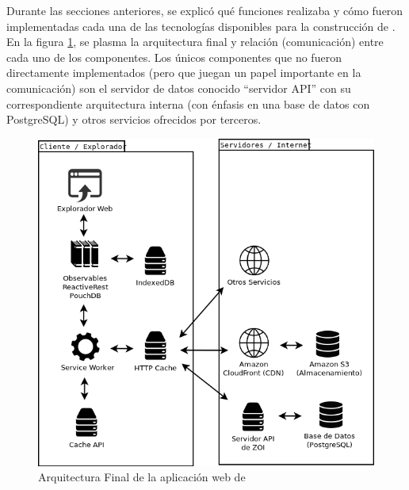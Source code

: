 Durante las secciones anteriores, se explicó qué funciones realizaba y cómo fueron implementadas cada una de las tecnologías disponibles para la construcción de \pwas. En la figura \ref{fig:diagram}, se plasma la arquitectura final y relación (comunicación) entre cada uno de los componentes. Los únicos componentes que no fueron directamente implementados (pero que juegan un papel importante en la comunicación) son el servidor de datos conocido ``servidor API'' con su correspondiente arquitectura interna (con énfasis en una base de datos con PostgreSQL) y otros servicios ofrecidos por terceros.

\begin{figure}
  \includegraphics[width=\linewidth]{figures/diagram/diagram.png}
  \caption{Arquitectura Final de la aplicación web de \business}
  \label{fig:diagram}
\end{figure}
